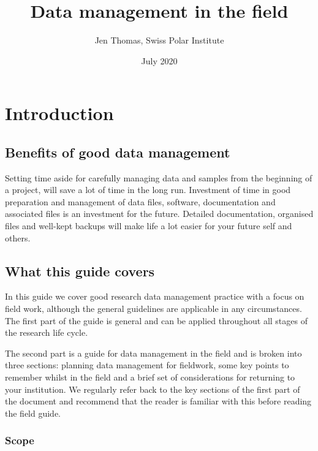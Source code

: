 \documentclass[a4paper,oneside]{report}
\title{Data management in the field}
\author{Jen Thomas, Swiss Polar Institute}
\date{July 2020}
\begin{document}
\maketitle

{
\hypersetup{linkcolor=}
\setcounter{tocdepth}{1}
\tableofcontents
}
\hypertarget{introduction}{%
\chapter{Introduction}\label{introduction}}

\hypertarget{benefits-of-good-data-management}{%
\section{Benefits of good data
management}\label{benefits-of-good-data-management}}

Setting time aside for carefully managing data and samples from the
beginning of a project, will save a lot of time in the long run.
Investment of time in good preparation and management of data files,
software, documentation and associated files is an investment for the
future. Detailed documentation, organised files and well-kept backups
will make life a lot easier for your future self and others.

\hypertarget{what-this-guide-covers}{%
\section{What this guide covers}\label{what-this-guide-covers}}

In this guide we cover good research data management practice with a
focus on field work, although the general guidelines are applicable in
any circumstances. The first part of the guide is general and can be
applied throughout all stages of the research life cycle.

The second part is a guide for data management in the field and is
broken into three sections: planning data management for fieldwork, some
key points to remember whilst in the field and a brief set of
considerations for returning to your institution. We regularly refer
back to the key sections of the first part of the document and recommend
that the reader is familiar with this before reading the field guide.

\hypertarget{scope}{%
\subsection{Scope}\label{scope}}
\end{document}
